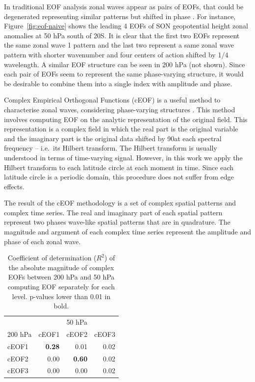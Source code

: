 \documentclass[smallextended]{svjour3}       %
\begin{document}
In traditional EOF analysis zonal waves appear as pairs of EOFs, that could be degenerated representing similar patterns but shifted in phase \citep{horel1984}.
For instance, Figure~\ref{fig:eof-naive} shows the leading 4 EOFs of SON geopotential height zonal anomalies at 50 hPa south of 20\degree S.
It is clear that the first two EOFs represent the same zonal wave 1 pattern and the last two represent a same zonal wave pattern with shorter wavenumber and four centers of action shifted by 1/4 wavelength.
A similar EOF structure can be seen in 200 hPa (not shown).
Since each pair of EOFs seem to represent the same phase-varying structure, it would be desirable to combine them into a single index with amplitude and phase.

Complex Empirical Orthogonal Functions (cEOF) is a useful method to characterise zonal waves, considering phase-varying structures \citep{horel1984}.
This method involves computing EOF on the analytic representation of the original field.
This representation is a complex field in which the real part is the original variable and the imaginary part is the original data shifted by 90\degree at each spectral frequency -- i.e.~its Hilbert transform.
The Hilbert transform is usually understood in terms of time-varying signal.
However, in this work we apply the Hilbert transform to each latitude circle at each moment in time.
Since each latitude circle is a periodic domain, this procedure does not suffer from edge effects.

The result of the cEOF methodology is a set of complex spatial patterns and complex time series.
The real and imaginary part of each spatial pattern represent two phases wave-like spatial patterns that are in quadrature.
The magnitude and argument of each complex time series represent the amplitude and phase of each zonal wave.



\begin{table}

\caption{\label{tab:corr-ceof-splitted}Coefficient of determination (\(R^2\)) of the absolute magnitude of complex EOFs between 200 hPa and 50 hPa computing EOF separately for each level. p-values lower than 0.01 in bold.}
\centering
\begin{tabular}[t]{l>{}r>{}r>{}r}
\toprule
\multicolumn{1}{c}{} & \multicolumn{3}{c}{50 hPa} \\
\cmidrule(l{3pt}r{3pt}){2-4}
200 hPa & cEOF1 & cEOF2 & cEOF3\\
\midrule
cEOF1 & \textbf{0.28} & 0.01 & 0.02\\
cEOF2 & 0.00 & \textbf{0.60} & 0.02\\
cEOF3 & 0.00 & 0.00 & 0.02\\
\bottomrule
\end{tabular}
\end{table}
\end{document}
